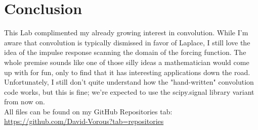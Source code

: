 \documentclass[12pt]{report}
\begin{document}
\section{Conclusion}

This Lab complimented my already growing interest in convolution. While I'm aware that convolution is typically dismissed in favor of Laplace, I still love the idea of the impulse response scanning the domain of the forcing function. The whole premise sounds like one of those silly ideas a mathematician would come up with for fun, only to find that it has interesting applications down the road. Unfortunately, I still don't quite understand how the "hand-written" convolution code works, but this is fine; we're expected to use the scipy.signal library variant from now on. \\

All files can be found on my GitHub Repositories tab:\\
\url{https://github.com/David-Vorous?tab=repositories}
\end{document}
